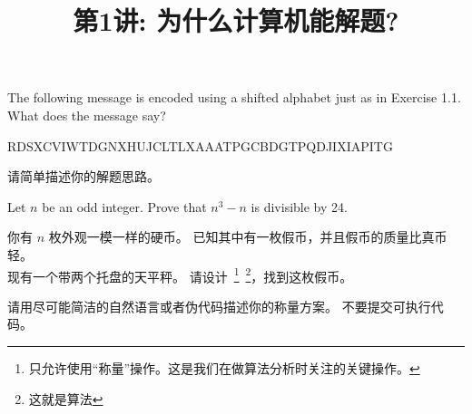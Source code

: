 \documentclass[a4paper, justified]{tufte-handout}
\title{第1讲: 为什么计算机能解题?}
\date{\zhtoday} %
\begin{document}
\maketitle
\noplagiarism %
\begin{abstract}
  \begin{center}{}
  \end{center}
\end{abstract}
\beginrequired

\begin{problem}[UD Problem $1.6$]
  The following message is encoded using a shifted alphabet just as in Exercise 1.1. 
  What does the message say?  
  
  RDSXCVIWTDGNXHUJCLTLXAAATPGCBDGTPQDJIXIAPITG

  请简单描述你的解题思路。
\end{problem}

\begin{solution}
\end{solution}

\begin{problem}[UD Problem $1.9$]
  Let $n$ be an odd integer. Prove that $n^3 − n$ is divisible by 24.
\end{problem}

\begin{solution}
\end{solution}

\begin{problem}[$n$ 枚硬币]

  你有 $n$ 枚外观一模一样的硬币。
  已知其中有一枚假币，并且假币的质量比真币轻。\\
  现有一个带两个托盘的天平秤。
  请设计~\footnote{只允许使用``称量''操作。这是我们在做算法分析时关注的关键操作。}~\footnote{这就是算法}，找到这枚假币。

  请用尽可能简洁的自然语言或者伪代码描述你的称量方案。
  不要提交可执行代码。
\end{problem}
\end{document}
